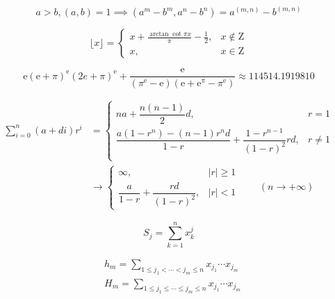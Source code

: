 \begin{equation}
    a>b,(a,b)=1 \implies (a^m-b^m,a^n-b^n)=a^{(m,n)}-b^{(m,n)}
\end{equation}

\begin{equation}
    \lfloor x\rfloor=\begin{cases}
        \displaystyle x+\frac{\arctan\cot\pi x}{\pi}-\frac{1}{2}, & x\notin\mathrm{Z} \\
        x,                                                        & x\in\mathrm{Z}
    \end{cases}
\end{equation}

\begin{equation}
    \mathrm{e}(\mathrm{e}+\pi)^\mathrm{e}(2e + \pi)^\mathrm{e}+\frac{\mathrm{e}}{(\pi^\mathrm{e}-\mathrm{e})(\mathrm{e}+\mathrm{e}^\pi-\pi^\mathrm{e})}\approx 114514.1919810
\end{equation}

\begin{equation}
    \begin{aligned}
        \sum_{i=0}^n(a+di)r^i & =\begin{cases}
                                     na+\dfrac{n(n-1)}{2}d,                                        & r=1    \\
                                     \dfrac{a(1-r^n)-(n-1)r^nd}{1-r}+\dfrac{1-r^{n-1}}{(1-r)^2}rd, & r\ne 1 \\
                                 \end{cases} \\
                              & \to\begin{cases}
                                       \infty,                             & |r|\geq 1 \\
                                       \dfrac{a}{1-r}+\dfrac{rd}{(1-r)^2}, & |r|<1
                                   \end{cases}\qquad(n\to+\infty)
    \end{aligned}
\end{equation}

\begin{equation}
    S_j = \sum_{k=1}^nx_k^j
\end{equation}

\begin{eqnarray}
    &h_m = \sum_{1\leq j_1 < \cdots < j_m \leq n} x_{j_1}\cdots x_{j_m}\\
    &H_m = \sum_{1\leq j_1 \leq \cdots \leq j_m \leq n} x_{j_1}\cdots x_{j_m}
\end{eqnarray}

